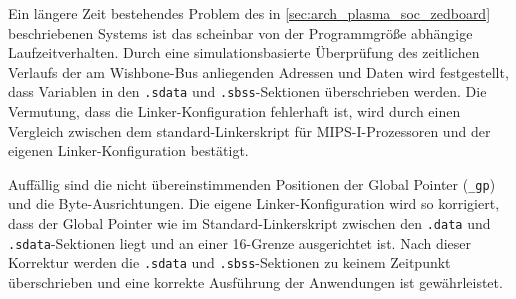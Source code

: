 Ein längere Zeit bestehendes Problem des in \cref{sec:arch_plasma_soc_zedboard} beschriebenen Systems ist das scheinbar von der Programmgröße abhängige Laufzeitverhalten. Durch eine simulationsbasierte Überprüfung des zeitlichen Verlaufs der am Wishbone-Bus anliegenden Adressen und Daten wird festgestellt, dass Variablen in den \texttt{.sdata} und \texttt{.sbss}-Sektionen überschrieben werden. Die Vermutung, dass die Linker-Konfiguration fehlerhaft ist, wird durch einen Vergleich zwischen dem standard-Linkerskript für \gls{MIPS}-\RN{1}-Prozessoren und der eigenen Linker-Konfiguration bestätigt. 

Auffällig sind die nicht übereinstimmenden Positionen der Global Pointer (\texttt{\_gp}) und die Byte-Ausrichtungen. Die eigene Linker-Konfiguration wird so korrigiert, dass der Global Pointer wie im Standard-Linkerskript zwischen den \texttt{.data} und \texttt{.sdata}-Sektionen liegt und an einer \SI{16}{\byte}-Grenze ausgerichtet ist. Nach dieser Korrektur werden die \texttt{.sdata} und \texttt{.sbss}-Sektionen zu keinem Zeitpunkt überschrieben und eine korrekte Ausführung der Anwendungen ist gewährleistet.

%
%	
%	
%
%
%	
%	


